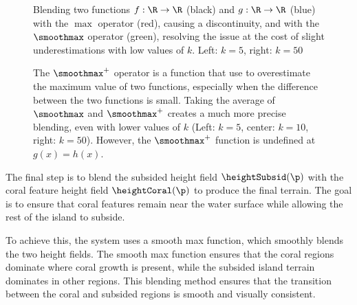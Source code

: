 \begin{figure}[H]

    \caption{Blending two functions $f: \R \to \R$ (black) and $g: \R \to \R$ (blue) with the $\max$ operator (red), causing a discontinuity, and with the $\smoothmax$ operator (green), resolving the issue at the cost of slight underestimations with low values of $k$. Left: $k=5$, right: $k=50$}
    \label{fig:coral-island_blend-function-island}
\end{figure}

\begin{figure}[H]

    \caption{The $\smoothmax^+$ operator is a function that use to overestimate the maximum value of two functions, especially when the difference between the two functions is small. Taking the average of $\smoothmax$ and $\smoothmax^+$ creates a much more precise blending, even with lower values of $k$ (Left: $k=5$, center: $k=10$, right: $k=50$). However, the $\smoothmax^+$ function is undefined at $g(x) = h(x)$.}
    \label{fig:coral-island_blend-function-island-with-upper}
\end{figure}

The final step is to blend the subsided height field $\heightSubsid(\p)$ with the coral feature height field $\heightCoral(\p)$ to produce the final terrain. The goal is to ensure that coral features remain near the water surface while allowing the rest of the island to subside.

To achieve this, the system uses a smooth max function, which smoothly blends the two height fields. The smooth max function ensures that the coral regions dominate where coral growth is present, while the subsided island terrain dominates in other regions. This blending method ensures that the transition between the coral and subsided regions is smooth and visually consistent.

